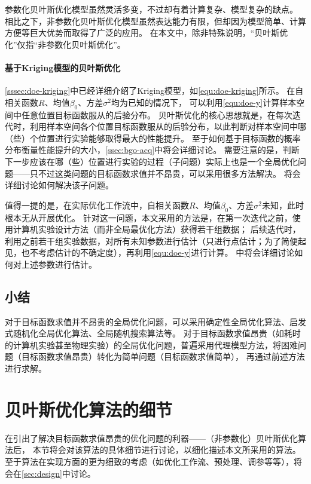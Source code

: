 \documentclass[index]{subfiles}
\begin{document}
参数化贝叶斯优化模型虽然灵活多变，不过却有着计算复杂、模型复杂的缺点。
相比之下，非参数化贝叶斯优化模型虽然表达能力有限，但却因为模型简单、计算方便等巨大优势而取得了广泛的应用。
在本文中，除非特殊说明，“贝叶斯优化”仅指“非参数化贝叶斯优化”。

\paragraph{基于Kriging模型的贝叶斯优化}
\cref{sssec:doe-kriging}中已经详细介绍了Kriging模型，如\cref{equ:doe-kriging}所示。
在自相关函数$R$、均值$\beta_0$、方差$\sigma^2$均为已知的情况下，
可以利用\cref{equ:doe-y}计算样本空间中任意位置目标函数服从的后验分布。
贝叶斯优化的核心思想就是，在每次迭代时，利用样本空间各个位置目标函数服从的后验分布，以此判断对样本空间中哪（些）个位置进行实验能够取得最大的性能提升。
至于如何基于目标函数的概率分布衡量性能提升的大小，\cref{ssec:bgo-acq}中将会详细讨论。
需要注意的是，判断下一步应该在哪（些）位置进行实验的过程（子问题）实际上也是一个全局优化问题——只不过这类问题的目标函数求值并不昂贵，可以采用很多方法解决。
将会详细讨论如何解决该子问题。\cite{shahriari2016}

值得一提的是，在实际优化工作流中，自相关函数$R$、均值$\beta_0$、方差$\sigma^2$未知，此时根本无从开展优化。
针对这一问题，本文采用的方法是，在第一次迭代之前，使用计算机实验设计方法（而非全局最优化方法）获得若干组数据；
后续迭代时，利用之前若干组实验数据，对所有未知参数进行估计（只进行点估计；为了简便起见，也不考虑估计的不确定度），再利用\cref{equ:doe-y}进行计算。
中将会详细讨论如何对上述参数进行估计。

\subsection{小结}
对于目标函数求值并不昂贵的全局优化问题，可以采用确定性全局优化算法、启发式随机化全局优化算法、全局随机搜索算法等。
对于目标函数求值昂贵（如耗时的计算机实验甚至物理实验）的全局优化问题，普遍采用代理模型方法，将困难问题（目标函数求值昂贵）转化为简单问题（目标函数求值简单），
再通过前述方法进行求解。

\section{贝叶斯优化算法的细节}\label{ssec:bgo}
在引出了解决目标函数求值昂贵的优化问题的利器——（非参数化）贝叶斯优化算法后，
本节将会对该算法的具体细节进行讨论，以细化描述本文所采用的算法。
至于算法在实现方面的更为细致的考虑（如优化工作流、预处理、调参等等），将会在\cref{sec:design}中讨论。
\end{document}
